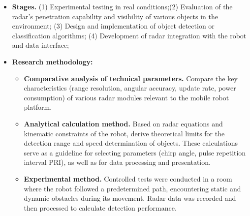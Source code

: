 \begin{itemize}
\item \textbf{Stages.} (1) Experimental testing in real conditions;(2) Evaluation of the radar's penetration capability and visibility of various objects in the environment; (3) Design and implementation of object detection or classification algorithms; (4) Development of radar integration with the robot and data interface; 

\item \textbf{Research methodology:}
\begin{itemize}
\item \textbf{Comparative analysis of technical parameters.}
Compare the key characteristics (range resolution, angular accuracy, update rate, power consumption) of various radar modules relevant to the mobile robot platform.
\item \textbf{Analytical calculation method.}
Based on radar equations and kinematic constraints of the robot, derive theoretical limits for the detection range and speed determination of objects. These calculations serve as a guideline for selecting parameters (chirp angle, pulse repetition interval PRI), as well as for data processing and presentation.

\item \textbf{Experimental method.}
Controlled tests were conducted in a room where the robot followed a predetermined path, encountering static and dynamic obstacles during its movement. Radar data was recorded and then processed to calculate detection performance.
\end{itemize}
\end{itemize}






